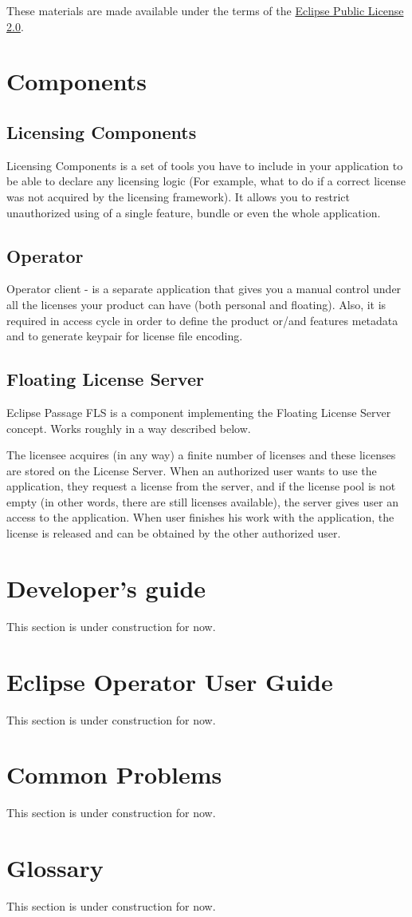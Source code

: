 \documentclass[12pt]{article}
\begin{document}
These materials are made available under the terms of the \href{https://www.eclipse.org/legal/epl-2.0/}{Eclipse Public License 2.0}.


\section{Components}

\subsection{Licensing Components}

Licensing Components is a set of tools you have to include in your application to be able to declare any licensing logic (For example, what to do if a correct license was not acquired by the licensing framework). 
It allows you to restrict unauthorized using of a single feature, bundle or even the whole application.

\subsection{Operator}

Operator client - is a separate application that gives you a manual control under all the licenses your product can have (both personal and floating). Also, it is required
in access cycle in order to define the product or/and features metadata and to generate keypair for license file encoding.

\subsection{Floating License Server}

Eclipse Passage FLS is a component implementing the Floating License Server concept. Works roughly in a way described below.

The licensee acquires (in any way) a finite number of licenses and these licenses are stored on the License Server. When an authorized user wants to use the application,
they request a license from the server, and if the license pool is not empty (in other words, there are still licenses available), the server gives user an access to the
application. When user finishes his work with the application, the license is released and can be obtained by the other authorized user.

\section{Developer's guide}

This section is under construction for now.

\section{Eclipse Operator User Guide}

This section is under construction for now.

\section{Common Problems}

This section is under construction for now.

\section{Glossary}

This section is under construction for now.
\end{document}
